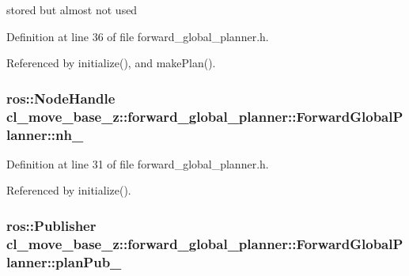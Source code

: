 stored but almost not used 



Definition at line 36 of file forward\+\_\+global\+\_\+planner.\+h.



Referenced by initialize(), and make\+Plan().

\subsubsection[{\texorpdfstring{nh\+\_\+}{nh_}}]{\setlength{\rightskip}{0pt plus 5cm}ros\+::\+Node\+Handle cl\+\_\+move\+\_\+base\+\_\+z\+::forward\+\_\+global\+\_\+planner\+::\+Forward\+Global\+Planner\+::nh\+\_\+\hspace{0.3cm}{\ttfamily [private]}}\hypertarget{classcl__move__base__z_1_1forward__global__planner_1_1ForwardGlobalPlanner_aab61c90829040df58fb99dff3b566c72}{}\label{classcl__move__base__z_1_1forward__global__planner_1_1ForwardGlobalPlanner_aab61c90829040df58fb99dff3b566c72}


Definition at line 31 of file forward\+\_\+global\+\_\+planner.\+h.



Referenced by initialize().

\subsubsection[{\texorpdfstring{plan\+Pub\+\_\+}{planPub_}}]{\setlength{\rightskip}{0pt plus 5cm}ros\+::\+Publisher cl\+\_\+move\+\_\+base\+\_\+z\+::forward\+\_\+global\+\_\+planner\+::\+Forward\+Global\+Planner\+::plan\+Pub\+\_\+\hspace{0.3cm}{\ttfamily [private]}}\hypertarget{classcl__move__base__z_1_1forward__global__planner_1_1ForwardGlobalPlanner_a927dc6a687fac3751033d9736cf8dfcf}{}\label{classcl__move__base__z_1_1forward__global__planner_1_1ForwardGlobalPlanner_a927dc6a687fac3751033d9736cf8dfcf}


